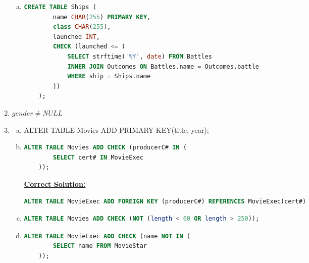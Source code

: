 \documentclass[12pt]{article}
\begin{document}
\begin{enumerate}[1.]
\begin{enumerate}[a)]
        \item

    \begin{lstlisting}[language=SQL]
    CREATE TABLE Ships (
        name CHAR(255) PRIMARY KEY,
        class CHAR(255),
        launched INT,
        CHECK (launched <= (
            SELECT strftime('%Y', date) FROM Battles
            INNER JOIN Outcomes ON Battles.name = Outcomes.battle
            WHERE ship = Ships.name
        ))
    );
    \end{lstlisting}

    \end{enumerate}

    \item $gender \neq NULL$
    \item

    \begin{enumerate}[a)]
        \item ALTER TABLE Movies ADD PRIMARY KEY(title, year);
        \item
    \begin{lstlisting}[language=SQL]
    ALTER TABLE Movies ADD CHECK (producerC# IN (
        SELECT cert# IN MovieExec
    ));
    \end{lstlisting}

        \bigskip

        \begin{mdframed}
            \underline{\textbf{Correct Solution:}}

            \bigskip

    \begin{lstlisting}[language=SQL]
    ALTER TABLE MovieExec ADD FOREIGN KEY (producerC#) REFERENCES MovieExec(cert#)
    \end{lstlisting}

        \end{mdframed}

        \item

    \begin{lstlisting}[language=SQL]
    ALTER TABLE Movies ADD CHECK (NOT (length < 60 OR length > 250));
    \end{lstlisting}

        \item

    \begin{lstlisting}[language=SQL]
    ALTER TABLE MovieExec ADD CHECK (name NOT IN (
        SELECT name FROM MovieStar
    ));


\end{lstlisting}
\end{enumerate}
\end{enumerate}
\end{document}
